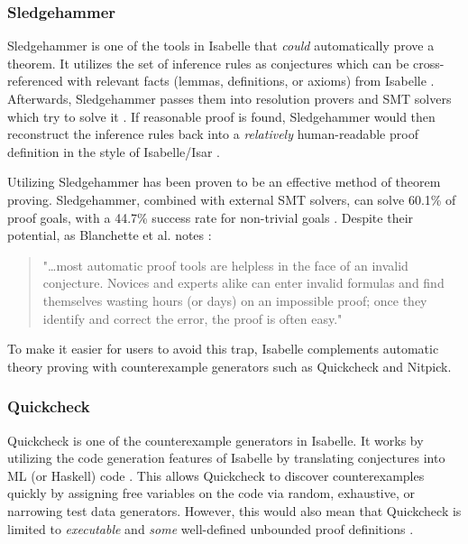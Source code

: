 \subsubsection{Sledgehammer}
\label{sec:Sledgehammer}

Sledgehammer is one of the tools in Isabelle that \emph{could} automatically prove a theorem. It utilizes the set of inference rules as 
conjectures which can be cross-referenced with relevant facts (lemmas, definitions, or axioms) from Isabelle \cite[Sec. 3]{isabelleProof}. 
Afterwards, Sledgehammer passes them into resolution provers and SMT solvers which try to solve it \cite[Sec. 3.3]{isabelleProof}. If reasonable 
proof is found, Sledgehammer would then reconstruct the inference rules back into a \emph{relatively} human-readable proof definition in the style of 
Isabelle/Isar \cite[Sec. 3.4]{isabelleProof}.

Utilizing Sledgehammer has been proven to be an effective method of theorem proving. Sledgehammer, combined with external SMT solvers, can 
solve 60.1\% of proof goals, with a 44.7\% success rate for non-trivial goals \cite[Sec. 6]{isabelleSledgehammerSMT}. Despite their 
potential, as Blanchette et al. notes \cite[pp. 2]{isabelleProof}:

\begin{quote}
    "\dots most automatic proof tools are helpless in the face of an invalid conjecture. Novices and experts alike can enter invalid formulas and 
    find themselves wasting hours (or days) on an impossible proof; once they identify and correct the error, the proof is often easy."
\end{quote}

To make it easier for users to avoid this trap, Isabelle complements automatic theory proving with counterexample generators such as Quickcheck 
and Nitpick.

\subsubsection{Quickcheck}
\label{sec:Quickcheck}

Quickcheck is one of the counterexample generators in Isabelle. It works by utilizing the code generation features of Isabelle by translating 
conjectures into ML (or Haskell) code \cite{isabelleQuickcheck}. This allows Quickcheck to discover counterexamples quickly by assigning 
free variables on the code via random, exhaustive, or narrowing test data generators. However, this would also mean that Quickcheck is limited 
to \emph{executable} and \emph{some} well-defined unbounded proof definitions \cite{isabelleQuickcheck}.

